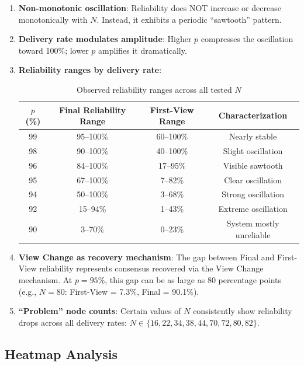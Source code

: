 \documentclass[12pt,a4paper]{article}
\begin{document}
\begin{enumerate}
  \item \textbf{Non-monotonic oscillation}: Reliability does NOT increase or decrease monotonically with $N$. Instead, it exhibits a periodic ``sawtooth'' pattern.
  
  \item \textbf{Delivery rate modulates amplitude}: Higher $p$ compresses the oscillation toward 100\%; lower $p$ amplifies it dramatically.
  
  \item \textbf{Reliability ranges by delivery rate}:
  
  \begin{table}[H]
  \centering
  \caption{Observed reliability ranges across all tested $N$}
  \begin{tabular}{cccc}
  \toprule
  $p$ (\%) & Final Reliability Range & First-View Range & Characterization \\
  \midrule
  99 & 95--100\% & 60--100\% & Nearly stable \\
  98 & 90--100\% & 40--100\% & Slight oscillation \\
  96 & 84--100\% & 17--95\% & Visible sawtooth \\
  95 & 67--100\% & 7--82\% & Clear oscillation \\
  94 & 50--100\% & 3--68\% & Strong oscillation \\
  92 & 15--94\% & 1--43\% & Extreme oscillation \\
  90 & 3--70\% & 0--23\% & System mostly unreliable \\
  \bottomrule
  \end{tabular}
  \end{table}
  
  \item \textbf{View Change as recovery mechanism}: The gap between Final and First-View reliability represents consensus recovered via the View Change mechanism. At $p = 95\%$, this gap can be as large as 80 percentage points (e.g., $N = 80$: First-View = 7.3\%, Final = 90.1\%).
  
  \item \textbf{``Problem'' node counts}: Certain values of $N$ consistently show reliability drops across all delivery rates: $N \in \{16, 22, 34, 38, 44, 70, 72, 80, 82\}$.
\end{enumerate}

\subsection{Heatmap Analysis}
\end{document}
